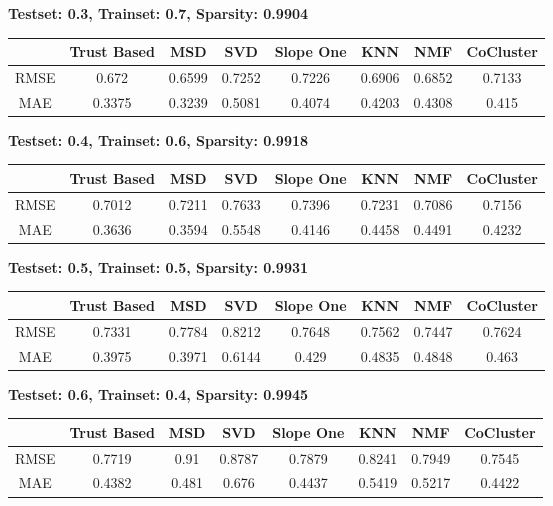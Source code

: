 	\textbf{Testset: 0.3, Trainset: 0.7, Sparsity: 0.9904}
	\begin{center}
	\begin{tabular}{ | c | c | c | c | c | c | c | c |}
		\hline
		& Trust Based & MSD & SVD & Slope One & KNN & NMF & CoCluster\\ 
		\hline
		RMSE&0.672  & 0.6599  & 0.7252  & 0.7226  & 0.6906  & 0.6852  & 0.7133\\
		\hline
		MAE&0.3375  & 0.3239  & 0.5081  & 0.4074  & 0.4203  & 0.4308  & 0.415\\
		\hline
	\end{tabular}
	\end{center} 
	\vspace{1cm}
	\textbf{Testset: 0.4, Trainset: 0.6, Sparsity: 0.9918}
	\begin{center}
	\begin{tabular}{ | c | c | c | c | c | c | c | c |}
		\hline
		& Trust Based & MSD & SVD & Slope One & KNN & NMF & CoCluster\\ 
		\hline
		RMSE&0.7012  & 0.7211  & 0.7633  & 0.7396  & 0.7231  & 0.7086  & 0.7156\\
		\hline
		MAE&0.3636  & 0.3594  & 0.5548  & 0.4146  & 0.4458  & 0.4491  & 0.4232\\
		\hline
	\end{tabular}
	\end{center} 
	\vspace{1cm}
	\textbf{Testset: 0.5, Trainset: 0.5, Sparsity: 0.9931}
	\begin{center}
	\begin{tabular}{ | c | c | c | c | c | c | c | c |}
		\hline
		& Trust Based & MSD & SVD & Slope One & KNN & NMF & CoCluster\\ 
		\hline
		RMSE&0.7331  & 0.7784  & 0.8212  & 0.7648  & 0.7562  & 0.7447  & 0.7624\\
		\hline
		MAE&0.3975  & 0.3971  & 0.6144  & 0.429  & 0.4835  & 0.4848  & 0.463\\
		\hline
	\end{tabular}
	\end{center} 
	\vspace{1cm}
	\textbf{Testset: 0.6, Trainset: 0.4, Sparsity: 0.9945}
	\begin{center}
	\begin{tabular}{ | c | c | c | c | c | c | c | c |}
		\hline
		& Trust Based & MSD & SVD & Slope One & KNN & NMF & CoCluster\\ 
		\hline
		RMSE&0.7719  & 0.91  & 0.8787  & 0.7879  & 0.8241  & 0.7949  & 0.7545\\
		\hline
		MAE&0.4382  & 0.481  & 0.676  & 0.4437  & 0.5419  & 0.5217  & 0.4422\\
		\hline
	\end{tabular}
	\end{center} 
